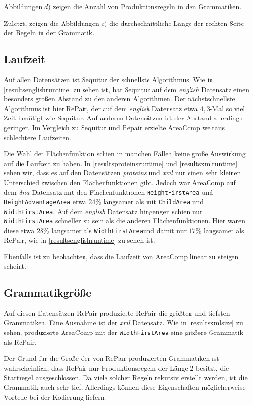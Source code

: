 Abbildungen $d)$ zeigen die Anzahl von Produktionsregeln in den Grammatiken. 

Zuletzt, zeigen die Abbildungen $e)$ die durchschnittliche Länge der rechten Seite der Regeln in der Grammatik.

\subsection{Laufzeit}

Auf allen Datensätzen ist Sequitur der schnellste Algorithmus. Wie in \autoref{resultsenglishruntime} zu sehen ist, hat Sequitur auf dem \emph{english} Datensatz einen besonders großen Abstand zu den anderen Algorithmen. Der nächstschnellste Algorithmus ist hier RePair, der auf dem \emph{english} Datensatz etwa $4,3$-Mal so viel Zeit benötigt wie Sequitur. Auf anderen Datensätzen ist der Abstand allerdings geringer.
Im Vergleich zu Sequitur und Repair erzielte AreaComp weitaus schlechtere Laufzeiten.

Die Wahl der Flächenfunktion schien in manchen Fällen keine große Auswirkung auf die Laufzeit zu haben. In \autoref{resultsproteinsruntime} und \autoref{resultsxmlruntime} sehen wir, dass es auf den Datensätzen \emph{proteins} und \emph{xml} nur einen sehr kleinen Unterschied zwischen den Flächenfunktionen gibt. 
Jedoch war AreaComp auf dem \emph{dna} Datensatz mit den Flächenfunktionen \texttt{HeightFirstArea} und \texttt{HeightAdvantageArea} etwa $24$\% langsamer als mit \texttt{ChildArea} und \texttt{WidthFirstArea}. Auf dem \emph{english} Datensatz hingengen schien nur \texttt{WidthFirstArea} schneller zu sein als die anderen Flächenfunktionen. Hier waren diese etwa $28$\% langsamer als \texttt{WidthFirstArea}und damit nur $17$\% langsamer als RePair, wie in \autoref{resultsenglishruntime} zu sehen ist.

Ebenfalls ist zu beobachten, dass die Laufzeit von AreaComp linear zu steigen scheint.

\subsection{Grammatikgröße}
\label{grammarsize}

Auf diesen Datensätzen RePair produzierte RePair die größten und tiefsten Grammatiken. Eine Ausnahme ist der \emph{xml} Datensatz. Wie in \autoref{resultsxmlsize} zu sehen, produzierte AreaComp mit der \texttt{WidthFirstArea} eine größere Grammatik als RePair.

Der Grund für die Größe der von RePair produzierten Grammatiken ist wahrscheinlich, dass RePair nur Produktionsregeln der Länge $2$ besitzt, die Startregel ausgeschlossen. Da viele solcher Regeln rekursiv erstellt werden, ist die Grammatik auch sehr tief. Allerdings können diese Eigenschaften möglicherweise Vorteile bei der Kodierung liefern. \cite{tabei_succinct_2013}

